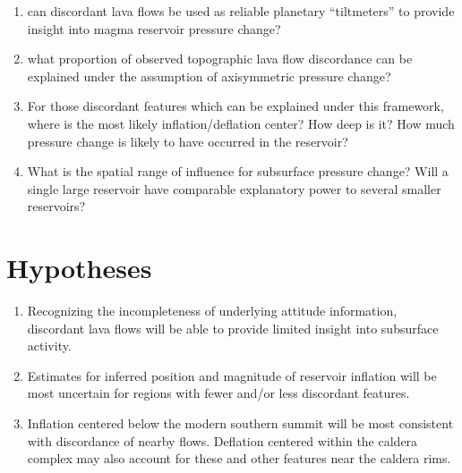 \begin{enumerate}
    \item can discordant lava flows be used as reliable planetary ``tiltmeters'' to provide insight into magma reservoir pressure change?
    \item what proportion of observed topographic lava flow discordance can be explained under the assumption of axisymmetric pressure change?
    \item For those discordant features which can be explained under this framework, where is the most likely inflation/deflation center? How deep is it? How much pressure change is likely to have occurred in the reservoir?
    \item What is the spatial range of influence for subsurface pressure change? Will a single large reservoir have comparable explanatory power to several smaller reservoirs? 
\end{enumerate}

\section{Hypotheses}

\begin{enumerate}
    \item Recognizing the incompleteness of underlying attitude information, discordant lava flows will be able to provide limited insight into subsurface activity.
    \item Estimates for inferred position and magnitude of reservoir inflation will be most uncertain for regions with fewer and/or less discordant features. 
    \item Inflation centered below the modern southern summit will be most consistent with discordance of nearby flows. Deflation centered within the caldera complex may also account for these and other features near the caldera rims.
\end{enumerate}